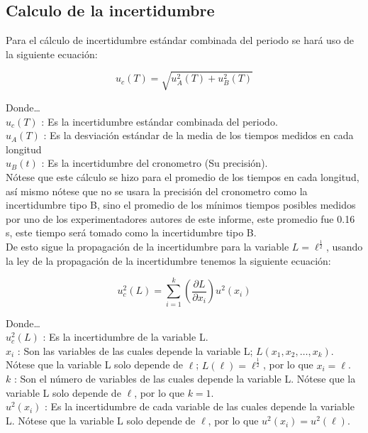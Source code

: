 \documentclass[12pt,a4paper]{article}
\begin{document}
\subsection{Calculo de la incertidumbre}

Para el cálculo de incertidumbre estándar combinada del periodo se hará uso de la siguiente ecuación:

\[u_c(T) = \sqrt{u_A^2(T) + u_B^2(T)}\]

Donde…\\

$u_c(T)$ : Es la incertidumbre estándar combinada del periodo.\\

$u_A(T)$ : Es la desviación estándar de la media de los tiempos medidos en cada longitud \\

$u_B(t)$ : Es la incertidumbre del cronometro (Su precisión).\\

Nótese que este cálculo se hizo para el promedio de los tiempos en cada longitud, así mismo nótese que no se usara la precisión del cronometro como la incertidumbre tipo B, sino el promedio de los mínimos tiempos posibles medidos por uno de los experimentadores autores de este informe, este promedio fue 0.16 s, este tiempo será tomado como la incertidumbre tipo B.\\

De esto sigue la propagación de la incertidumbre para la variable  $L = \ell^{\frac{1}{2}}$, usando la ley de la propagación de la incertidumbre tenemos la siguiente ecuación:

\[u^2_c (L) = \sum_{i = 1}^k \left( \frac{\partial L}{\partial x_i}\right) u^2(x_i)\]

Donde…\\

$u^2_c(L)$ : Es la incertidumbre de la variable L.\\

$x_i$ : Son las variables de las cuales depende la variable L; $L(x_1, x_2, …, x_k)$. Nótese que la variable L solo depende de $\ell$; $L(\ell) = \ell^{\frac{1}{2}}$, por lo que $x_i = \ell$.\\

$k$ : Son el número de variables de las cuales depende la variable L. Nótese que la variable L solo depende de $\ell$, por lo que $k = 1$.\\

$u^2(x_i)$ : Es la incertidumbre de cada variable de las cuales depende la variable L. Nótese que la variable L solo depende de $\ell$, por lo que $u^2(x_i) = u^2(\ell)$.\\
\end{document}

